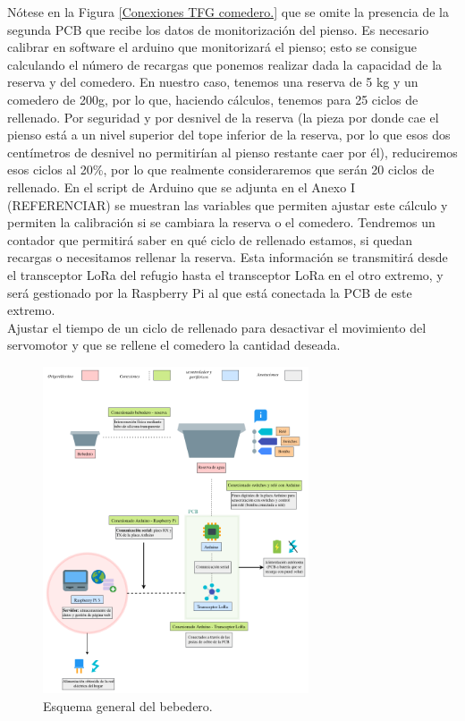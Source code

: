 \documentclass[12pt]{article}
\begin{document}
	\noindent Nótese en la Figura \ref{Conexiones TFG comedero.} que se omite la presencia de la segunda PCB que recibe los datos de monitorización del pienso.  Es necesario calibrar en software el arduino que monitorizará el pienso; esto se consigue calculando el número de recargas que ponemos realizar dada la capacidad de la reserva y del comedero. En nuestro caso, tenemos una reserva de 5 kg y un comedero de 200g, por lo que, haciendo cálculos, tenemos para 25 ciclos de rellenado. Por seguridad y por desnivel de la reserva (la pieza por donde cae el pienso está a un nivel superior del tope inferior de la reserva, por lo que esos dos centímetros de desnivel no permitirían al pienso restante caer por él), reduciremos esos ciclos al 20\%, por lo que realmente consideraremos que serán 20 ciclos de rellenado. En el script de Arduino que se adjunta en el Anexo I (REFERENCIAR)  se muestran las variables que permiten ajustar este cálculo y permiten la calibración si se cambiara la reserva o el comedero. Tendremos un contador que permitirá saber en qué ciclo de rellenado estamos, si quedan recargas o necesitamos rellenar la reserva. Esta información se transmitirá desde el transceptor LoRa del refugio hasta el transceptor LoRa en el otro extremo, y será gestionado por la Raspberry Pi al que está conectada la PCB de este extremo.\\ 
	
	\noindent Ajustar el tiempo de un ciclo de rellenado para desactivar el movimiento del servomotor y que se rellene el comedero la cantidad deseada. \\
	
	\pagebreak
	
		\begin{figure}[h]
		\begin{center}
			\includegraphics[width=0.7\textwidth]{img/conexiones tfg-bebedero.png}
			\caption{Esquema general del bebedero. }
			\label{Conexiones TFG bebedero.}
		\end{center}
	\end{figure}
	
\end{document}
